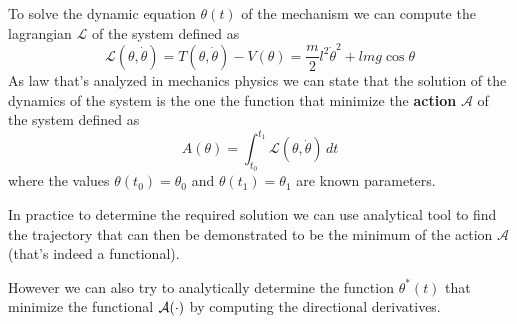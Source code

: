 	To solve the dynamic equation $\theta(t)$ of the mechanism we can compute the lagrangian $\mathcal L$ of the system defined as
	\[ \mathcal L(\theta,\dot\theta) = T(\theta,\dot\theta)-V(\theta) = \frac m 2 l^2\dot\theta^2 + lmg\cos\theta \]
	As law that's analyzed in mechanics physics we can state that the solution of the dynamics of the system is the one the function that minimize the \textbf{action} $\mathcal A$ of the system defined as
	\begin{equation} \label{eq:func:action}
		A(\theta) = \int_{t_0}^{t_1} \mathcal L(\theta,\dot\theta)\, dt
	\end{equation}
	where the values $\theta(t_0)= \theta_0$ and $\theta(t_1)=\theta_1$ are known parameters.
	
	In practice to determine the required solution we can use analytical tool to find the trajectory that can then be demonstrated to be the minimum of the action $\mathcal A$ (that's indeed a functional).
	
	However we can also try to analytically determine the function $\theta^*(t)$ that minimize the functional $\mathcal{A}(\cdot)$ by computing the directional derivatives. \vspace{3mm}
	
